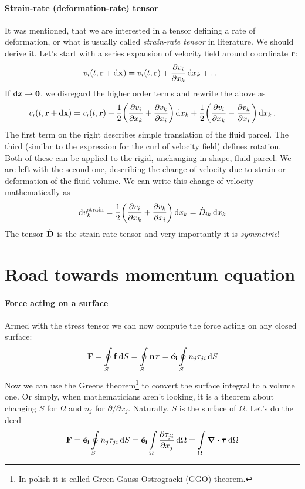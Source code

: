 \documentclass[a4paper]{article}
\begin{document}
\paragraph{Strain-rate (deformation-rate) tensor}
It was mentioned, that we are interested in a tensor defining a rate of
deformation, or what is usually called \emph{strain-rate tensor} in
literature. We should derive it. Let's start with a series expansion of
velocity field around coordinate \(\vb{r}\):
\[
	v_i(t, \vb{r} + \dd{\vb{x}}) = v_i(t, \vb{r}) + \pdv{v_i}{x_k}\dd{x_k}
	+ \dots
\]
If \(\dd{x}\rightarrow\vb{0}\), we disregard the higher order terms and
rewrite the above as
\[
	v_i(t, \vb{r} + \dd{\vb{x}}) = v_i(t, \vb{r})
	+ \frac{1}{2}\qty(\pdv{v_i}{x_k} + \pdv{v_k}{x_i})\dd{x_k}
	+ \frac{1}{2}\qty(\pdv{v_i}{x_k} - \pdv{v_k}{x_i})\dd{x_k}.
\]
The first term on the right describes simple translation of the fluid parcel.
The third (similar to the expression for the curl of velocity field) defines
rotation. Both of these can be applied to the rigid, unchanging in shape,
fluid parcel. We are left with the second one, describing the change of
velocity due to  strain or deformation of the fluid volume.
We can write this change of velocity mathematically as
\begin{equation}\label{eq::strain_rate_tensor}
	\dd{v^\mathrm{strain}_k}
	= \frac{1}{2}\qty(\pdv{v_i}{x_k} + \pdv{v_k}{x_i})\dd{x_k}
	= \dot{D}_{ik}\dd{x_k}
\end{equation}
The tensor \(\dot{\vb{D}}\) is the strain-rate tensor and very importantly
it is \emph{symmetric}!

\section{Road towards momentum equation}

\paragraph{Force acting on a surface}
Armed with the stress tensor we can now compute the force acting on any
closed surface:
\[
	\vb{F} = \oint\limits_S \vb{f} \dd{S}
	= \oint\limits_S \vb{n}\bm{\tau}
	= \hat{\vb{e_i}}\oint\limits_S n_j \tau_{ji}\dd{S}
\]
Now we can use the Greens theorem\footnote{In polish it is called
	Green-Gauss-Ostrogracki (GGO) theorem.} to convert the surface integral
to a volume one. Or simply, when mathematicians aren't looking, it is
a theorem about changing \(S\) for \(\Omega\) and \(n_j\) for
\(\partial/\partial x_j\). Naturally, \(S\) is the surface of \(\Omega\).
Let's do the deed
\[
	\vb{F}
	= \hat{\vb{e_i}}\oint\limits_S n_j \tau_{ji}\dd{S}
	= \hat{\vb{e_i}}\int\limits_\Omega \pdv{\tau_{ji}}{x_j}\dd{\Omega}
	= \int\limits_\Omega \div\bm{\tau} \dd{\Omega}
\]
\end{document}
